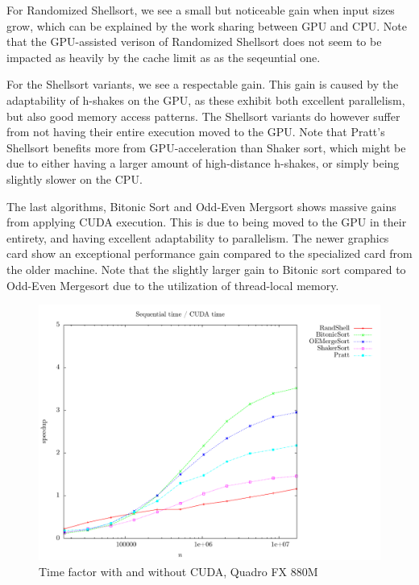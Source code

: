 For Randomized Shellsort, we see a small but noticeable gain when input sizes grow, which can be explained by the work sharing between GPU and CPU. Note that the GPU-assisted verison of Randomized Shellsort does not seem to be impacted as heavily by the cache limit as as the seqeuntial one.

For the Shellsort variants, we see a respectable gain. This gain is caused by the adaptability of h-shakes on the GPU, as these exhibit both excellent parallelism, but also good memory access patterns. The Shellsort variants do however suffer from not having their entire execution moved to the GPU. Note that Pratt's Shellsort benefits more from GPU-acceleration than Shaker sort, which might be due to either having a larger amount of high-distance h-shakes, or simply being slightly slower on the CPU.

The last algorithms, Bitonic Sort and Odd-Even Mergsort shows massive gains from applying CUDA execution. This is due to being moved to the GPU in their entirety, and having excellent adaptability to parallelism. The newer graphics card show an exceptional performance gain compared to the specialized card from the older machine. Note that the slightly larger gain to Bitonic sort compared to Odd-Even Mergesort due to the utilization of thread-local memory.

\begin{figure}
\center
\includegraphics[width=\textwidth]{graphs/CUDA/timediff.pdf}
\caption{Time factor with and without CUDA, Quadro FX 880M}
\label{fig:CUDAQuadro:timediff}
\end{figure}

